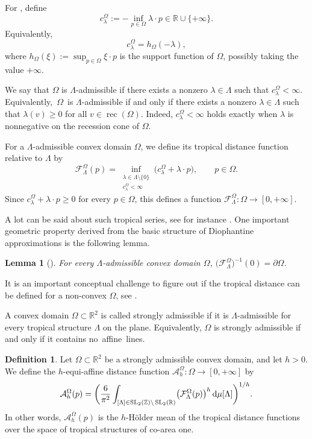 \documentclass[pdftex]{sigma}
\numberwithin{equation}{section}
\newtheorem{Lemma}[Theorem]{Lemma}
\theoremstyle{definition}
\newtheorem{Definition}[Theorem]{Definition}
\begin{document}
For , define
\[
c^\Omega_\lambda:=-\inf_{p\in \Omega}\lambda\cdot p \in \mathbb R\cup\{+\infty\}.
\]
Equivalently,
\[
c^\Omega_\lambda=h_\Omega(-\lambda),
\]
where $h_\Omega(\xi):=\sup_{p\in\Omega}\xi\cdot p$ is the support function of $\Omega$, possibly taking the value $+\infty$.

We say that $\Omega$ is $\Lambda$-admissible if there exists a nonzero $\lambda\in\Lambda$ such that $c^\Omega_\lambda<\infty$. Equivalently,~$\Omega$~is $\Lambda$-admissible if and only if there exists a nonzero $\lambda\in\Lambda$ such that
$\lambda(v)\ge 0$  for all $v\in \operatorname{rec}(\Omega)$.
Indeed, $c^\Omega_\lambda<\infty$ holds exactly when $\lambda$ is nonnegative on the recession cone of $\Omega$.

For a $\Lambda$-admissible convex domain $\Omega$, we define its tropical distance function relative to $\Lambda$ by
\[
\mathcal F^\Omega_\Lambda(p)
=
\inf_{\substack{\lambda\in\Lambda\setminus\{0\}\\ c^\Omega_\lambda<\infty}}
\bigl(c^\Omega_\lambda+\lambda\cdot p\bigr),
\qquad
p\in\Omega.
\]
Since $c^\Omega_\lambda+\lambda\cdot p\ge 0$ for every $p\in\Omega$, this defines a function
$
\mathcal F^\Omega_\Lambda\colon   \Omega\to [0,+\infty]$.

A lot can be said about such tropical series, see for instance \cite{kalinin2021shrinking, us_series, mikhalkin2023wave}. One important geometric property derived from the basic structure of Diophantine approximations is the following lemma.
\begin{Lemma}[{\cite[Lemma 4.4]{us_series}}]
For every $\Lambda$-admissible convex domain $\Omega$,
$\bigl(\mathcal F^\Omega_\Lambda\bigr)^{-1}(0)=\partial\Omega$.
\end{Lemma}
It is an important conceptual challenge to figure out if the tropical distance can be defined for a non-convex $\Omega$, see \cite{Shkolnikov2025PlanarTropicalCaustics}.

A convex domain $\Omega\subset\mathbb{R}^2$ is called strongly admissible if it is $\Lambda$-admissible for every tropical structure $\Lambda$ on the plane. Equivalently, $\Omega$ is strongly admissible if and only if it contains no~affine~lines.

\begin{Definition}
Let $\Omega\subset\mathbb{R}^2$ be a strongly admissible convex domain, and let $h>0$. We define the $h$-equi-affine distance function
$\mathcal{A}_{h}^\Omega\colon  \Omega\to[0,+\infty]$
by
\[
\mathcal{A}_{h}^\Omega(p)=
\biggl(
\frac{6}{\pi^2}
\int_{[\Lambda]\in \operatorname{SL}_2(\mathbb{Z})\backslash\operatorname{SL}_2(\mathbb{R})}
\bigl(\mathcal{F}^\Omega_\Lambda(p)\bigr)^{h}\,{\rm d}\mu[\Lambda]
\biggr)^{1/h}.
\]
In other words, $\mathcal{A}_{h}^\Omega(p)$ is the $h$-H\"older mean of the tropical distance functions over the space of tropical structures of co-area one.
\end{Definition}
\end{document}
